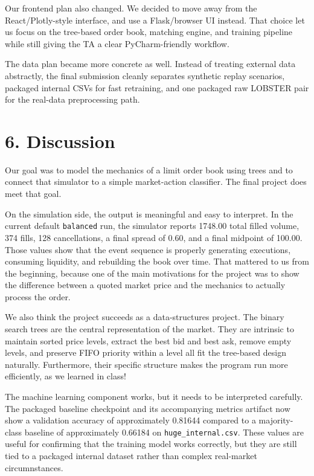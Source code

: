 \documentclass[11pt]{article}
\begin{document}
Our frontend plan also changed. We decided to move away from the
React/Plotly-style interface, and use a
Flask/browser UI instead. That choice let us focus on the tree-based order
book, matching engine, and training pipeline while still giving the TA a clear
PyCharm-friendly workflow.

The data plan became more concrete as well. Instead of treating external data
abstractly, the final submission cleanly separates synthetic replay scenarios,
packaged internal CSVs for fast retraining, and one packaged raw LOBSTER pair
for the real-data preprocessing path.

\section*{6. Discussion}
Our goal was to model the mechanics of a limit order book using trees and to
connect that simulator to a simple market-action classifier. The final project
does meet that goal.

On the simulation side, the output is meaningful and easy to interpret. In the
current default \texttt{balanced} run, the simulator reports 1748.00 total
filled volume, 374 fills, 128 cancellations, a final spread of 0.60, and a
final midpoint of 100.00. Those values show that the event sequence
is properly generating executions,
consuming liquidity, and rebuilding the book over time. That mattered to us
from the beginning, because one of the main motivations for the project was to
show the difference between a quoted market price and the mechanics to actually process the order.

We also think the project succeeds as a data-structures project. The binary search trees are the central representation of the
market. They are intrinsic to maintain sorted price levels, extract the best bid and best ask,
remove empty levels, and preserve FIFO priority within a level all fit the
tree-based design naturally. Furthermore, their specific structure makes the program run more efficiently, as we learned in class!

The machine learning component works, but it needs to be interpreted carefully.
The packaged baseline checkpoint and its accompanying metrics artifact now show
a validation accuracy of approximately 0.81644 compared to a majority-class
baseline of approximately 0.66184 on \texttt{huge\_internal.csv}. These values
are useful for confirming that the training model works correctly, but they are still tied to a packaged
internal dataset rather than complex real-market circumnstances.
\end{document}
